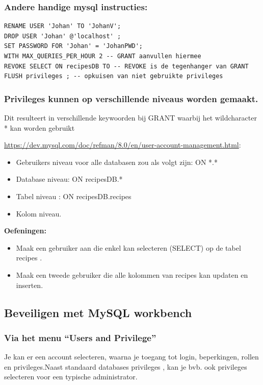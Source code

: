 \documentclass{article}
\newcommand{\bold}[1]{\textbf{#1}}
\begin{document}
\subsubsection{Andere handige mysql instructies:}
\begin{lstlisting}
RENAME USER 'Johan' TO 'JohanV';
DROP USER 'Johan' @'localhost' ;
SET PASSWORD FOR 'Johan' = 'JohanPWD';
WITH MAX_QUERIES_PER_HOUR 2 -- GRANT aanvullen hiermee
REVOKE SELECT ON recipesDB TO -- REVOKE is de tegenhanger van GRANT
FLUSH privileges ; -- opkuisen van niet gebruikte privileges
\end{lstlisting}

\subsubsection{Privileges kunnen op verschillende niveaus worden gemaakt. }
Dit resulteert in verschillende keywoorden bij GRANT waarbij het wildcharacter * kan worden gebruikt

\url{https://dev.mysql.com/doc/refman/8.0/en/user-account-management.html}:

\begin{itemize}
    \item Gebruikers niveau voor alle databasen zou als volgt zijn: ON *.*
    \item Database niveau: ON recipesDB.*
    \item Tabel niveau : ON recipesDB.recipes
    \item Kolom niveau.
\end{itemize}

\bold{Oefeningen:}

\begin{itemize}
    \item Maak een gebruiker aan die enkel kan selecteren (SELECT) op de tabel recipes .
    \item Maak een tweede gebruiker die alle kolommen van recipes kan updaten en inserten.
\end{itemize}

\subsection{Beveiligen met MySQL workbench}

\subsubsection{Via het menu ``Users and Privilege''}
Je kan er een account selecteren, waarna je toegang tot login, beperkingen, rollen en privileges.Naast
standaard databases privileges , kan je bvb. ook privileges selecteren voor een typische administrator.
\end{document}
